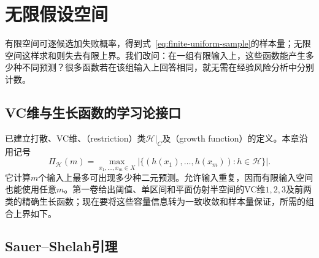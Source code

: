 \section{无限假设空间}
\label{sec:binary-infinite-class}

有限空间可逐候选加失败概率，得到式~\eqref{eq:finite-uniform-sample}的样本量；无限空间这样求和则失去有限上界。我们改问：在一组有限输入上，这些函数能产生多少种不同预测？很多函数若在该组输入上回答相同，就无需在经验风险分析中分别计数。

\subsection{VC维与生长函数的学习论接口}
\label{sec:binary-shattering-vc}

已建立打散、VC维、（restriction）类$\mathcal H|_C$及（growth function）的定义。本章沿用记号
\begin{equation}
 \Pi_{\mathcal H}(m)
 =\max_{x_1,\ldots,x_m\in X}
   \left|\{(h(x_1),\ldots,h(x_m)):h\in\mathcal H\}\right|.
 \label{eq:learning-growth-function}
\end{equation}
它计算$m$个输入上最多可出现多少种二元预测。允许输入重复，因而有限输入空间也能使用任意$m$。第一卷给出阈值、单区间和平面仿射半空间的VC维$1,2,3$及前两类的精确生长函数；现在要将这些容量信息转为一致收敛和样本量保证，所需的组合上界如下。

\subsection{Sauer--Shelah引理}
\label{sec:binary-growth-sauer}

